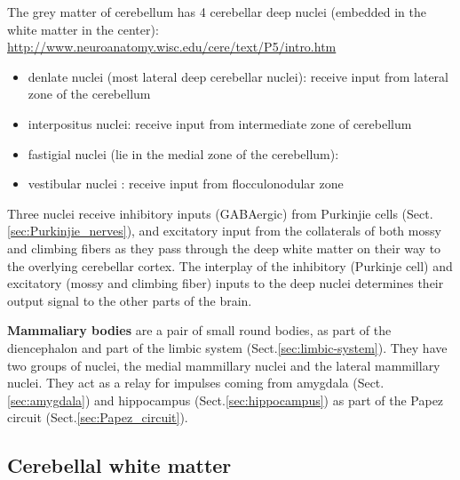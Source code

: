 The grey matter of cerebellum has 4 cerebellar deep nuclei (embedded in the
white matter in the center):  
\url{http://www.neuroanatomy.wisc.edu/cere/text/P5/intro.htm}
\begin{itemize}
  \item denlate nuclei (most lateral deep cerebellar nuclei): receive input from
  lateral zone of the cerebellum 
  
  \item interpositus nuclei: receive input from intermediate zone of cerebellum
  
  \item fastigial nuclei (lie in the medial zone of the cerebellum): 
  
  \item vestibular nuclei : receive input from flocculonodular zone
\end{itemize}
Three nuclei receive inhibitory inputs (GABAergic)
from Purkinjie cells (Sect.\ref{sec:Purkinjie_nerves}), and excitatory input
from the collaterals of both mossy and climbing fibers as they pass through the
deep white matter on their way to the overlying cerebellar cortex.
The interplay of the inhibitory (Purkinje cell) and excitatory (mossy and
climbing fiber) inputs to the deep nuclei determines their output signal to the
other parts of the brain.

%   

{\bf Mammaliary bodies} are a pair of small round bodies, as part of the
diencephalon and part of the limbic system (Sect.\ref{sec:limbic-system}).
They have two groups of nuclei, the medial mammillary nuclei and the lateral
mammillary nuclei. They act as a relay for impulses coming from amygdala
(Sect.\ref{sec:amygdala}) and hippocampus (Sect.\ref{sec:hippocampus})
as part of the Papez circuit (Sect.\ref{sec:Papez_circuit}). 


\subsection{Cerebellal white matter}
\label{sec:cerebellal_whitematter}

